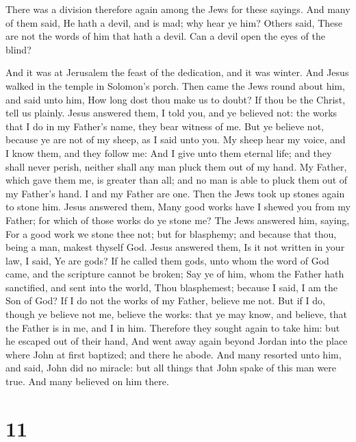  There was a division therefore again among the Jews for
these sayings.  And many of them said, He hath a devil, and
is mad; why hear ye him?  Others said, These are not the
words of him that hath a devil. Can a devil open the eyes of the blind?

 And it was at Jerusalem the feast of the dedication, and
it was winter.  And Jesus walked in the temple in Solomon's
porch.  Then came the Jews round about him, and said unto
him, How long dost thou make us to doubt? If thou be the Christ, tell us
plainly.  Jesus answered them, I told you, and ye believed
not: the works that I do in my Father's name, they bear witness of me.
 But ye believe not, because ye are not of my sheep, as I
said unto you.  My sheep hear my voice, and I know them,
and they follow me:  And I give unto them eternal life; and
they shall never perish, neither shall any man pluck them out of my
hand.  My Father, which gave them me, is greater than all;
and no man is able to pluck them out of my Father's hand. 
I and my Father are one.  Then the Jews took up stones
again to stone him.  Jesus answered them, Many good works
have I shewed you from my Father; for which of those works do ye stone
me?  The Jews answered him, saying, For a good work we
stone thee not; but for blasphemy; and because that thou, being a man,
makest thyself God.  Jesus answered them, Is it not written
in your law, I said, Ye are gods?  If he called them gods,
unto whom the word of God came, and the scripture cannot be broken;
 Say ye of him, whom the Father hath sanctified, and sent
into the world, Thou blasphemest; because I said, I am the Son of God?
 If I do not the works of my Father, believe me not.
 But if I do, though ye believe not me, believe the works:
that ye may know, and believe, that the Father is in me, and I in him.
 Therefore they sought again to take him: but he escaped
out of their hand,  And went away again beyond Jordan into
the place where John at first baptized; and there he abode.
 And many resorted unto him, and said, John did no miracle:
but all things that John spake of this man were true.  And
many believed on him there.

\hypertarget{section-10}{%
\section{11}\label{section-10}}

